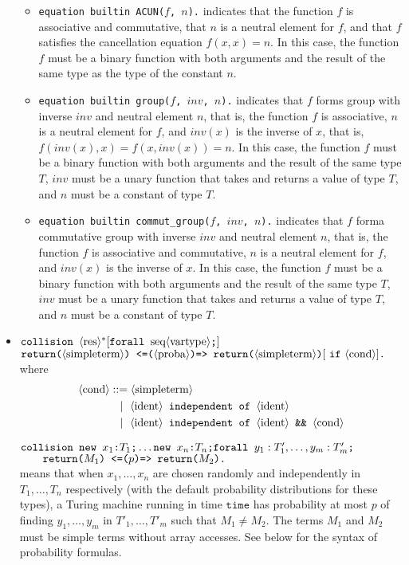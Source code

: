 \begin{itemize}
\begin{itemize}
\item \texttt{equation builtin ACUN($f$, $n$).} indicates that the function $f$ is associative and commutative, that $n$ is a neutral element for $f$, and that $f$ satisfies the cancellation equation $f(x,x) = n$. In this case, the function $f$ must be a binary function with both arguments and the result of the same type as the type of the constant $n$.

\item \texttt{equation builtin group($f$, $inv$, $n$).} indicates that $f$ forms group with inverse $inv$ and neutral element $n$, that is, the function $f$ is associative, $n$ is a neutral element for $f$, and $inv(x)$ is the inverse of $x$, that is, $f(inv(x),x) = f(x,inv(x)) = n$. In this case, the function $f$ must be a binary function with both arguments and the result of the same type $T$, $inv$ must be a unary function that takes and returns a value of type $T$, and $n$ must be a constant of type $T$.

\item \texttt{equation builtin commut\_group($f$, $inv$, $n$).} indicates that $f$ forma commutative group with inverse $inv$ and neutral element $n$, that is, the function $f$ is associative and commutative, $n$ is a neutral element for $f$, and $inv(x)$ is the inverse of $x$. In this case, the function $f$ must be a binary function with both arguments and the result of the same type $T$, $inv$ must be a unary function that takes and returns a value of type $T$, and $n$ must be a constant of type $T$.

\end{itemize}

\item 
$\texttt{collision }\langle\textrm{res}\rangle^*
[\texttt{forall }\textrm{seq}\langle\textrm{vartype}\rangle\texttt{;}]$\\
\null\qquad $\texttt{return(}\langle\textrm{simpleterm}\rangle\texttt{) <=(}\langle\textrm{proba}\rangle\texttt{)=> return(}\langle\textrm{simpleterm}\rangle\texttt{)}
[\ \texttt{if}\ \langle\textrm{cond}\rangle]\texttt{.}$\\
where
\begin{align*}
\langle\textrm{cond}\rangle &::= \langle\textrm{simpleterm}\rangle\\
&\ \ \mid \ \langle\textrm{ident}\rangle\texttt{ independent of }\langle\textrm{ident}\rangle\\
&\ \ \mid \ \langle\textrm{ident}\rangle\texttt{ independent of }\langle\textrm{ident}\rangle\texttt{ \&\& }\langle\textrm{cond}\rangle
\end{align*}

$\texttt{collision }\texttt{new\ }{x_1}\texttt{:}{T_1}\texttt{;}\ldots 
\texttt{new\ }{x_n}\texttt{:}{T_n}\texttt{;}
\texttt{forall }y_1:T'_1, \ldots, y_m:T'_m\texttt{;}$\\
$\null\qquad \texttt{return(}M_1\texttt{) <=(}p\texttt{)=> return(}M_2\texttt{).}$\\
means that when
$x_1, \ldots, x_n$ are chosen randomly 
and independently in $T_1, \ldots, T_n$ respectively (with the default probability distributions for these types), a Turing machine running in
time $\texttt{time}$ has probability at most $p$ of finding
$y_1, \ldots, y_m$ in $T'_1, \ldots, T'_m$ such that $M_1 \neq M_2$.
%
The terms $M_1$ and $M_2$ must be simple terms without array accesses.
See below for the syntax of probability formulas.


\end{itemize}
